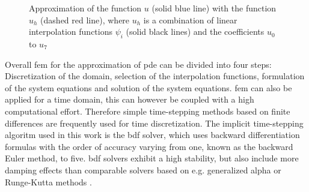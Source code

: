 \begin{figure}[H]
\centering
{}
\caption[Approximation of a function with \gls{fem}]{Approximation of the function $u$ (solid blue line) with the function $u_{h}$ (dashed red line), where $u_{h}$ is a combination of linear interpolation functions $\psi_{i}$ (solid black lines) and the coefficients $u_{0}$ to $u_{7}$ \cite{ComsolFEM}
\label{fig:FEM}
}
\end{figure}

Overall \gls{fem} for the approximation of \gls{pde} can be divided into four steps: Discretization of the domain, selection of the interpolation functions, formulation of the system equations and solution of the system equations. \newline 
\Gls{fem} can also be applied for a time domain, this can however be coupled with a high computational effort. Therefore simple time-stepping methods based on finite differences are frequently used for time discretization. The implicit time-stepping algoritm used in this work is the \gls{bdf} solver, which uses backward differentiation formulas with the order of accuracy varying from one, known as the backward Euler method, to five. \Gls{bdf} solvers exhibit a high stability, but also include more damping effects than comparable solvers based on e.g. generalized alpha or Runge-Kutta methods \cite{ComsolRefManual}.  


